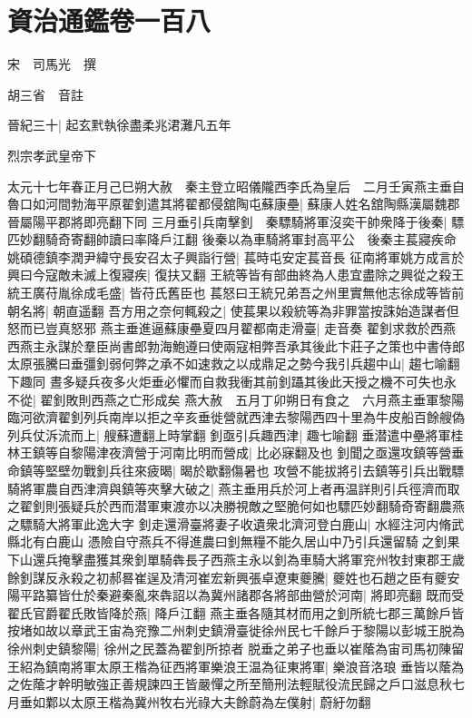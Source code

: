 \chapter{資治通鑑卷一百八}
宋　司馬光　撰

胡三省　音註

晉紀三十|{
	起玄黓執徐盡柔兆涒灘凡五年}


烈宗孝武皇帝下

太元十七年春正月己巳朔大赦　秦主登立昭儀隴西李氏為皇后　二月壬寅燕主垂自魯口如河間勃海平原翟釗遣其將翟都侵舘陶屯蘇康壘|{
	蘇康人姓名舘陶縣漢屬魏郡晉屬陽平郡將即亮翻下同}
三月垂引兵南擊釗　秦驃騎將軍沒奕干帥衆降于後秦|{
	驃匹妙翻騎奇寄翻帥讀曰率降戶江翻}
後秦以為車騎將軍封高平公　後秦主萇寢疾命姚碩德鎮李潤尹緯守長安召太子興詣行營|{
	萇時屯安定萇音長}
征南將軍姚方成言於興曰今寇敵未滅上復寢疾|{
	復扶又翻}
王統等皆有部曲終為人患宜盡除之興從之殺王統王廣苻胤徐成毛盛|{
	皆苻氏舊臣也}
萇怒曰王統兄弟吾之州里實無他志徐成等皆前朝名將|{
	朝直遥翻}
吾方用之奈何輒殺之|{
	使萇果以殺統等為非罪當按誅始造謀者但怒而已豈真怒邪}
燕主垂進逼蘇康壘夏四月翟都南走滑臺|{
	走音奏}
翟釗求救於西燕西燕主永謀於羣臣尚書郎勃海鮑遵曰使兩寇相弊吾承其後此卞莊子之策也中書侍郎太原張騰曰垂彊釗弱何弊之承不如速救之以成鼎足之勢今我引兵趨中山|{
	趨七喻翻下趣同}
晝多疑兵夜多火炬垂必懼而自救我衝其前釗躡其後此天授之機不可失也永不從|{
	翟釗敗則西燕之亡形成矣}
燕大赦　五月丁卯朔日有食之　六月燕主垂軍黎陽臨河欲濟翟釗列兵南岸以拒之辛亥垂徙營就西津去黎陽西四十里為牛皮船百餘艘偽列兵仗泝流而上|{
	艘蘇遭翻上時掌翻}
釗亟引兵趣西津|{
	趣七喻翻}
垂潜遣中壘將軍桂林王鎮等自黎陽津夜濟營于河南比明而營成|{
	比必寐翻及也}
釗聞之亟還攻鎮等營垂命鎮等堅壁勿戰釗兵往來疲暍|{
	暍於歇翻傷暑也}
攻營不能拔將引去鎮等引兵出戰驃騎將軍農自西津濟與鎮等夾擊大破之|{
	燕主垂用兵於河上者再温詳則引兵徑濟而取之翟釗則張疑兵於西而潜軍東渡亦以决勝視敵之堅脆何如也驃匹妙翻騎奇寄翻農燕之驃騎大將軍此逸大字}
釗走還滑臺將妻子收遺衆北濟河登白鹿山|{
	水經注河内脩武縣北有白鹿山}
憑險自守燕兵不得進農曰釗無糧不能久居山中乃引兵還留騎之釗果下山還兵掩擊盡獲其衆釗單騎犇長子西燕主永以釗為車騎大將軍兖州牧封東郡王歲餘釗謀反永殺之初郝晷崔逞及清河崔宏新興張卓遼東夔騰|{
	夔姓也石趙之臣有夔安}
陽平路纂皆仕於秦避秦亂來犇詔以為冀州諸郡各將部曲營於河南|{
	將即亮翻}
既而受翟氏官爵翟氏敗皆降於燕|{
	降戶江翻}
燕主垂各隨其材而用之釗所統七郡三萬餘戶皆按堵如故以章武王宙為兖豫二州刺史鎮滑臺徙徐州民七千餘戶于黎陽以彭城王脱為徐州刺史鎮黎陽|{
	徐州之民蓋為翟釗所掠者}
脱垂之弟子也垂以崔䕃為宙司馬初陳留王紹為鎮南將軍太原王楷為征西將軍樂浪王温為征東將軍|{
	樂浪音洛琅}
垂皆以䕃為之佐䕃才幹明敏強正善規諫四王皆嚴憚之所至簡刑法輕賦役流民歸之戶口滋息秋七月垂如鄴以太原王楷為冀州牧右光祿大夫餘蔚為左僕射|{
	蔚紆勿翻}
